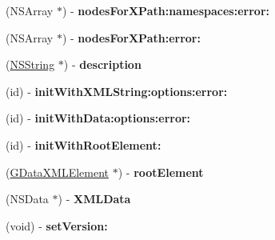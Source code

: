 \begin{DoxyCompactItemize}
\item 
\hypertarget{interface_g_data_x_m_l_document_a8f72a4eb0c1d63deb9cf99ec44459cc4}{
(NSArray $\ast$) -\/ {\bfseries nodesForXPath:namespaces:error:}}
\label{interface_g_data_x_m_l_document_a8f72a4eb0c1d63deb9cf99ec44459cc4}

\item 
\hypertarget{interface_g_data_x_m_l_document_aa354334c070410bde942b706ce83e190}{
(NSArray $\ast$) -\/ {\bfseries nodesForXPath:error:}}
\label{interface_g_data_x_m_l_document_aa354334c070410bde942b706ce83e190}

\item 
\hypertarget{interface_g_data_x_m_l_document_a9bc2a02ba6251d9670127923b43df1a9}{
(\hyperlink{class_n_s_string}{NSString} $\ast$) -\/ {\bfseries description}}
\label{interface_g_data_x_m_l_document_a9bc2a02ba6251d9670127923b43df1a9}

\item 
\hypertarget{interface_g_data_x_m_l_document_affa6920d0dfcedcd5bc0e21e74af971d}{
(id) -\/ {\bfseries initWithXMLString:options:error:}}
\label{interface_g_data_x_m_l_document_affa6920d0dfcedcd5bc0e21e74af971d}

\item 
\hypertarget{interface_g_data_x_m_l_document_a5aac20d1849c77ca0904fdd50e65491a}{
(id) -\/ {\bfseries initWithData:options:error:}}
\label{interface_g_data_x_m_l_document_a5aac20d1849c77ca0904fdd50e65491a}

\item 
\hypertarget{interface_g_data_x_m_l_document_ab91990967e0e050dfe889f9b67b0d4db}{
(id) -\/ {\bfseries initWithRootElement:}}
\label{interface_g_data_x_m_l_document_ab91990967e0e050dfe889f9b67b0d4db}

\item 
\hypertarget{interface_g_data_x_m_l_document_af6e96fd6b07f84044facaf26706f6497}{
(\hyperlink{interface_g_data_x_m_l_element}{GDataXMLElement} $\ast$) -\/ {\bfseries rootElement}}
\label{interface_g_data_x_m_l_document_af6e96fd6b07f84044facaf26706f6497}

\item 
\hypertarget{interface_g_data_x_m_l_document_a984d2f49915376794041612b8c7b0534}{
(NSData $\ast$) -\/ {\bfseries XMLData}}
\label{interface_g_data_x_m_l_document_a984d2f49915376794041612b8c7b0534}

\item 
\hypertarget{interface_g_data_x_m_l_document_ac43d5fecaa5ca156d4a2202604f63098}{
(void) -\/ {\bfseries setVersion:}}
\label{interface_g_data_x_m_l_document_ac43d5fecaa5ca156d4a2202604f63098}


\end{DoxyCompactItemize}
